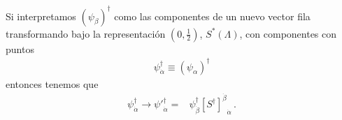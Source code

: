\begin{frame}
Si interpretamos  $\left( \psi_\beta \right)^{\dagger}$ como las componentes de un nuevo vector fila transformando bajo la representación $(0,\frac{1}{2})$,
 $S^{*}(\Lambda)$, con componentes con puntos
\begin{align}
 \psi_{\dot{\alpha}}^{\dagger}\equiv \left( \psi_\alpha \right)^{\dagger}
\end{align}
entonces tenemos que 
\begin{align}
{\psi}_{\dot{\alpha}}^{\dagger}\to  {\psi'}_{\dot{\alpha}}^{\dagger}=& \psi_{\dot{\beta}}^{\dagger}{\left[{S^{\dagger}}\right]^{\dot{\beta}}}_{\dot{\alpha}}\,.
\end{align}
\end{frame}

